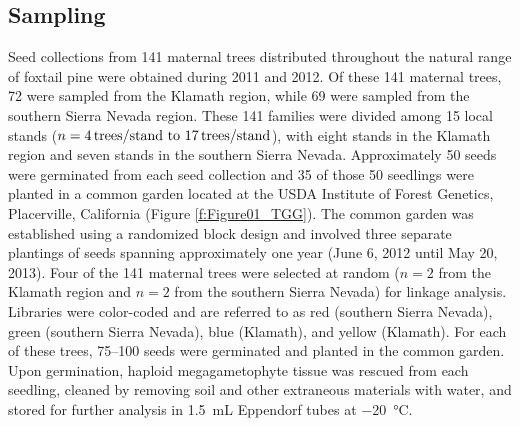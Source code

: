 \documentclass[smallextended]{svjour3}
\begin{document}
\subsection*{Sampling}
Seed collections from 141 maternal trees distributed throughout the natural
range of foxtail pine were obtained during 2011 and 2012. Of these 141 maternal
trees, 72 were sampled from the Klamath region, while 69 were sampled from the
southern Sierra Nevada region. These 141 families were divided among 15 local
stands ($n = \text{\SIrange{4}{17}{trees/stand}}$), with eight stands in the
Klamath region and seven stands in the southern Sierra Nevada.  Approximately 50
seeds were germinated from each seed collection and 35 of those 50 seedlings
were planted in a common garden located at the USDA Institute of Forest
Genetics, Placerville, California (Figure \ref{f:Figure01_TGG}). The common
garden was established using a randomized block design and involved three
separate plantings of seeds spanning approximately one year (June 6, 2012
until May 20, 2013). Four of the 141 maternal trees were selected at random ($n =
2$ from the Klamath region and $n = 2$ from the southern Sierra Nevada) for
linkage analysis. Libraries were color-coded and are referred to as red
(southern Sierra Nevada), green (southern Sierra Nevada), blue (Klamath), and
yellow (Klamath).  For each of these trees, \SIrange{75}{100}{} seeds were
germinated and planted in the common garden.  Upon germination, haploid
megagametophyte tissue was rescued from each seedling, cleaned by removing soil
and other extraneous materials with water, and stored for further analysis in
\SI{1.5}{\mL} Eppendorf tubes at \SI{-20}{\celsius}.
\end{document}
